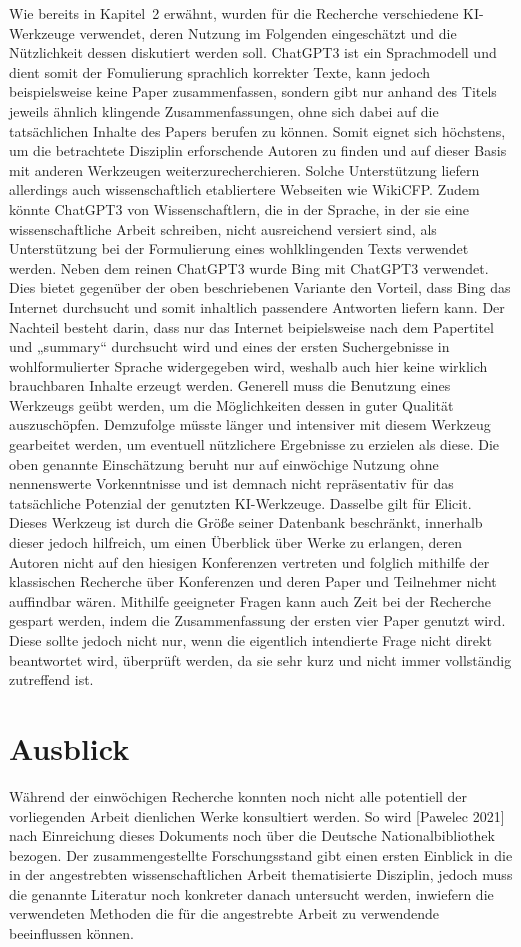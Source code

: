 \documentclass[12pt]{article}
\begin{document}
Wie bereits in Kapitel 2 erwähnt, wurden für die Recherche verschiedene KI-Werkzeuge verwendet, deren Nutzung im Folgenden eingeschätzt und die Nützlichkeit dessen diskutiert werden soll. 
ChatGPT3 ist ein Sprachmodell und dient somit der Fomulierung sprachlich korrekter Texte, kann jedoch beispielsweise keine Paper zusammenfassen, sondern gibt nur anhand des Titels jeweils ähnlich klingende Zusammenfassungen, ohne sich dabei auf die tatsächlichen Inhalte des Papers berufen zu können. Somit eignet sich höchstens, um die betrachtete Disziplin erforschende Autoren zu finden und auf dieser Basis mit anderen Werkzeugen weiterzurecherchieren. Solche Unterstützung liefern allerdings auch wissenschaftlich etabliertere Webseiten wie WikiCFP. Zudem könnte ChatGPT3 von Wissenschaftlern, die in der Sprache, in der sie eine wissenschaftliche Arbeit schreiben, nicht ausreichend versiert sind, als Unterstützung bei der Formulierung eines wohlklingenden Texts verwendet werden.
Neben dem reinen ChatGPT3 wurde Bing mit ChatGPT3 verwendet. Dies bietet gegenüber der oben beschriebenen Variante den Vorteil, dass Bing das Internet durchsucht und somit inhaltlich passendere Antworten liefern kann. Der Nachteil besteht darin, dass nur das Internet beipielsweise nach dem Papertitel und „summary“ durchsucht wird und eines der ersten Suchergebnisse in wohlformulierter Sprache widergegeben wird, weshalb auch hier keine wirklich brauchbaren Inhalte erzeugt werden.
Generell muss die Benutzung eines Werkzeugs geübt werden, um die Möglichkeiten dessen in guter Qualität auszuschöpfen. Demzufolge müsste länger und intensiver mit diesem Werkzeug gearbeitet werden, um eventuell nützlichere Ergebnisse zu erzielen als diese. Die oben genannte Einschätzung beruht nur auf einwöchige Nutzung ohne nennenswerte Vorkenntnisse und ist demnach nicht repräsentativ für das tatsächliche Potenzial der genutzten KI-Werkzeuge.
Dasselbe gilt für Elicit. Dieses Werkzeug ist durch die Größe seiner Datenbank beschränkt, innerhalb dieser jedoch hilfreich, um einen Überblick über Werke zu erlangen, deren Autoren nicht auf den hiesigen Konferenzen vertreten und folglich mithilfe der klassischen Recherche über Konferenzen und deren Paper und Teilnehmer nicht auffindbar wären. Mithilfe geeigneter Fragen kann auch Zeit bei der Recherche gespart werden, indem die Zusammenfassung der ersten vier Paper genutzt wird. Diese sollte jedoch nicht nur, wenn die eigentlich intendierte Frage nicht direkt beantwortet wird, überprüft werden, da sie sehr kurz und nicht immer vollständig zutreffend ist.
\section{Ausblick}
Während der einwöchigen Recherche konnten noch nicht alle potentiell der vorliegenden Arbeit dienlichen Werke konsultiert werden. So wird [Pawelec 2021] nach Einreichung dieses Dokuments noch über die Deutsche Nationalbibliothek bezogen.
Der zusammengestellte Forschungsstand gibt einen ersten Einblick in die in der angestrebten wissenschaftlichen Arbeit thematisierte Disziplin, jedoch muss die genannte Literatur noch konkreter danach untersucht werden, inwiefern die verwendeten Methoden die für die angestrebte Arbeit zu verwendende beeinflussen können.
\end{document}
